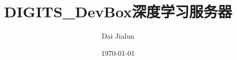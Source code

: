 

\title{\vspace{-2em} DIGITS\_DevBox深度学习服务器\\
\normalsize{}}
\author{Dai Jialun}
\date{\vspace{-0.7em} \today \vspace{-0.7em}}
\maketitle\thispagestyle{fancy}
\maketitle



